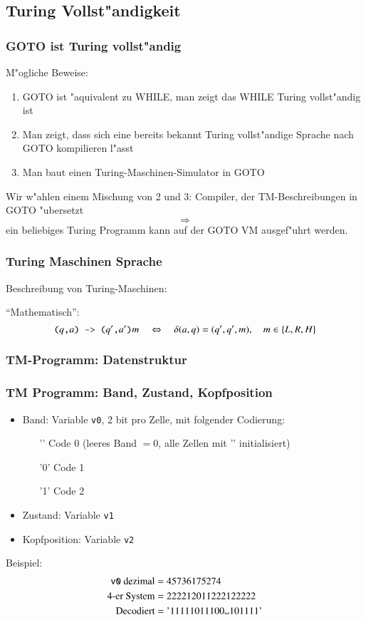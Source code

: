 \documentclass{beamer}
\begin{document}
\begin{frame}
\section{Turing Vollst"andigkeit}
\frametitle{GOTO ist Turing vollst"andig}

M"ogliche Beweise:
\begin{enumerate}
\item GOTO ist "aquivalent zu WHILE, man zeigt das WHILE Turing vollst"andig ist
\item Man zeigt, dass sich eine bereits bekannt Turing vollst"andige Sprache
nach GOTO kompilieren l"asst
\item Man baut einen Turing-Maschinen-Simulator in GOTO
\end{enumerate}

Wir w"ahlen einem Mischung von 2 und 3: Compiler, der TM-Beschreibungen
in GOTO "ubersetzt
\[
\Rightarrow
\]
ein beliebiges Turing Programm kann auf der GOTO VM ausgef"uhrt werden.
\end{frame}

\begin{frame}
\frametitle{Turing Maschinen Sprache}
Beschreibung von Turing-Maschinen:
{\small

}
``Mathematisch'':
\[
\text{\tt (}
q
\text{\tt ,}
a
\text{\tt ) -> (}
q'
\text{\tt ,}
a'
\text{\tt )}
m
\quad
\Leftrightarrow
\quad
\delta(a,q)=(q',q',m),
\quad m\in \{L, R, H\}
\]

\end{frame}

\begin{frame}
\frametitle{TM-Programm: Datenstruktur}

\end{frame}

\begin{frame}
\frametitle{TM Programm: Band, Zustand, Kopfposition}
\begin{itemize}
\item Band: Variable {\tt v0}, 2 bit pro Zelle, mit folgender Codierung:
\begin{itemize}
\item['\blank'\quad] Code 0 (leeres Band $= 0$, alle Zellen mit '\blank' initialisiert)
\item['0'\quad] Code 1
\item['1'\quad] Code 2
\end{itemize}
\item Zustand: Variable {\tt v1}
\item Kopfposition: Variable {\tt v2}
\end{itemize}
Beispiel:
\begin{align*}
\text{{\tt v0} dezimal} &= 45736175274\\
\text{4-er System}&=222212011222122222\\
\text{Decodiert}&=\text{'11111011100\blank101111'}
\end{align*}

\end{frame}
\end{document}
